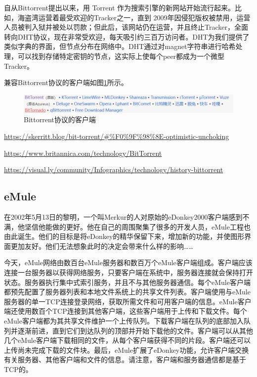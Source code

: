 \documentclass[a4paper,twoside]{scrbook}
\begin{document}
\begin{CJK}{UTF8}{gbsn}
自从Bittorrent提出以来，用 Torrent 作为搜索引擎的新网站开始流行起来。比如，海盗湾运营着最受欢迎的Tracker之一，直到 2009年因侵犯版权被禁用，运营人员被判入狱并被处以罚款；但此后，该网站仍在运营，并且终止Tracker，全面转向DHT协议，现在非常受欢迎，每天吸引约三百万访问者。DHT为我们提供了类似字典的界面，但节点分布在网络中。DHT通过对magnet字符串进行哈希处理，可以找到存储特定密钥的节点，这实际上使每个peer都成为一个微型Tracker。

兼容Bittorrent协议的客户端如图\ref{fig:Bittorrent}所示。
\begin{figure}[!htbp]
\centering
\includegraphics[width=1\textwidth]{Figures/Bittorrent.png}
\caption{Bittorrent协议的客户端} 
\label{fig:Bittorrent}
\end{figure}


\url{https://skerritt.blog/bit-torrent/#%F0%9F%98%8E-optimistic-unchoking}

\url{https://www.britannica.com/technology/BitTorrent}

\url{https://visual.ly/community/Infographics/technology/history-bittorrent}

\subsection{eMule}
在2002年5月13日的黎明，一个叫Merkur的人对原始的eDonkey2000客户端感到不满，他坚信他能做的更好。他在自己的周围聚集了很多的开发人员，eMule工程也由此诞生。他们的目标是将eDonkey的精华保留下来，增加新的功能，并使图形界面更加友好。他们无法想象此时的决定会带来什么样的影响……

今天，eMule网络由数百台eMule服务器和数百万个eMule客户端组成。客户端应该连接一台服务器以获得网络服务，只要客户端在系统中，服务器连接就会保持打开状态。服务器执行集中式索引服务，并且不与其他服务器通信。每个eMule客户端都预先配置了服务器列表和本地文件系统上的共享文件列表。客户端使用与eMule服务器的单一TCP连接登录网络，获取所需文件和可用客户端的信息。eMule客户端还使用数百个TCP连接到其他客户端，这些客户端用于上传和下载文件。每个eMule客户端都为其共享文件维护一个上传队列。下载客户端在队列的底部加入队列并逐渐前进，直到它们到达队列的顶部并开始下载他的文件。客户端可以从其他几个eMule客户端下载相同的文件，从每个客户端获得不同的片段。客户端还可以上传尚未完成下载的文件块。最后，eMule扩展了eDonkey功能，允许客户端交换有关服务器、其他客户端和文件的信息。请注意，客户端和服务器通信都是基于TCP的。


\end{CJK}
\end{document}
